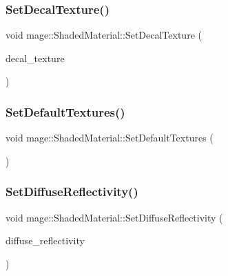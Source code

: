 \hypertarget{structmage_1_1_shaded_material_a4acb72c80dfc51dacb5cba6621234685}{}\label{structmage_1_1_shaded_material_a4acb72c80dfc51dacb5cba6621234685} 
\subsubsection{\texorpdfstring{Set\+Decal\+Texture()}{SetDecalTexture()}}
{\footnotesize\ttfamily void mage\+::\+Shaded\+Material\+::\+Set\+Decal\+Texture (\begin{DoxyParamCaption}\item[{\hyperlink{namespacemage_a1e01ae66713838a7a67d30e44c67703e}{Shared\+Ptr}$<$ \hyperlink{classmage_1_1_texture}{Texture} $>$}]{decal\+\_\+texture }\end{DoxyParamCaption})}

\hypertarget{structmage_1_1_shaded_material_afbd4b9d4a2f348124c08c005a712477d}{}\label{structmage_1_1_shaded_material_afbd4b9d4a2f348124c08c005a712477d} 
\subsubsection{\texorpdfstring{Set\+Default\+Textures()}{SetDefaultTextures()}}
{\footnotesize\ttfamily void mage\+::\+Shaded\+Material\+::\+Set\+Default\+Textures (\begin{DoxyParamCaption}{ }\end{DoxyParamCaption})\hspace{0.3cm}{\ttfamily [private]}}

\hypertarget{structmage_1_1_shaded_material_a2da4b314ab2f92659cbed167cc1f32c9}{}\label{structmage_1_1_shaded_material_a2da4b314ab2f92659cbed167cc1f32c9} 
\subsubsection{\texorpdfstring{Set\+Diffuse\+Reflectivity()}{SetDiffuseReflectivity()}}
{\footnotesize\ttfamily void mage\+::\+Shaded\+Material\+::\+Set\+Diffuse\+Reflectivity (\begin{DoxyParamCaption}\item[{const \hyperlink{structmage_1_1_r_g_b_spectrum}{R\+G\+B\+Spectrum} \&}]{diffuse\+\_\+reflectivity }\end{DoxyParamCaption})\hspace{0.3cm}{\ttfamily [noexcept]}}

